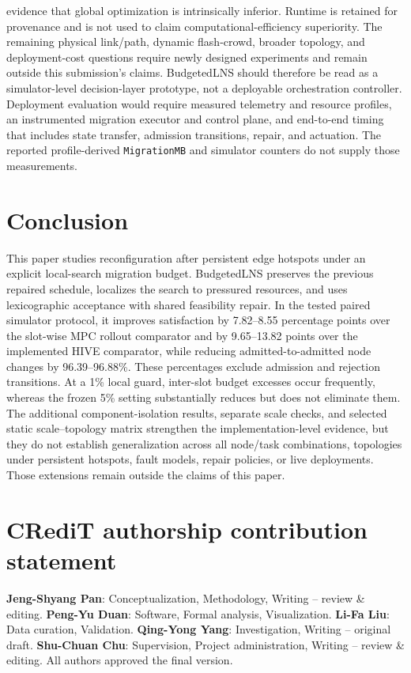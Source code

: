\documentclass[preprint,12pt]{elsarticle}
\begin{document}
evidence that global optimization is intrinsically inferior. Runtime is
retained for provenance and is not used to claim computational-efficiency
superiority. The remaining physical link/path, dynamic flash-crowd, broader
topology, and deployment-cost questions require newly designed experiments and
remain outside this submission's claims.
BudgetedLNS should therefore be read as a simulator-level decision-layer
prototype, not a deployable orchestration controller. Deployment evaluation
would require measured telemetry and resource profiles, an instrumented
migration executor and control plane, and end-to-end timing that includes
state transfer, admission transitions, repair, and actuation. The reported
profile-derived \texttt{MigrationMB} and simulator counters do not supply
those measurements.

\section{Conclusion}\label{conclusion}

This paper studies reconfiguration after persistent edge hotspots under
an explicit local-search migration budget. BudgetedLNS preserves the
previous repaired schedule, localizes the search to pressured resources,
and uses lexicographic acceptance with shared feasibility repair. In the
tested paired simulator protocol, it improves satisfaction by 7.82--8.55
percentage points over the slot-wise MPC rollout comparator and by 9.65--13.82 points
over the implemented HIVE comparator, while reducing admitted-to-admitted
node changes by 96.39--96.88\%. These percentages exclude admission and
rejection transitions. At a 1\% local guard, inter-slot budget excesses occur frequently, whereas the
frozen 5\% setting substantially reduces but does not eliminate them.
The additional component-isolation results, separate scale checks, and selected
static scale--topology matrix strengthen the implementation-level evidence,
but they do not establish generalization across all node/task combinations,
topologies under persistent hotspots, fault models, repair policies, or live
deployments. Those extensions remain outside the claims of this paper.
\section*{CRediT authorship contribution statement}
\textbf{Jeng-Shyang Pan}: Conceptualization, Methodology, Writing -- review
\& editing. \textbf{Peng-Yu Duan}: Software, Formal analysis, Visualization.
\textbf{Li-Fa Liu}: Data curation, Validation. \textbf{Qing-Yong Yang}:
Investigation, Writing -- original draft. \textbf{Shu-Chuan Chu}:
Supervision, Project administration, Writing -- review \& editing. All
authors approved the final version.
\end{document}
